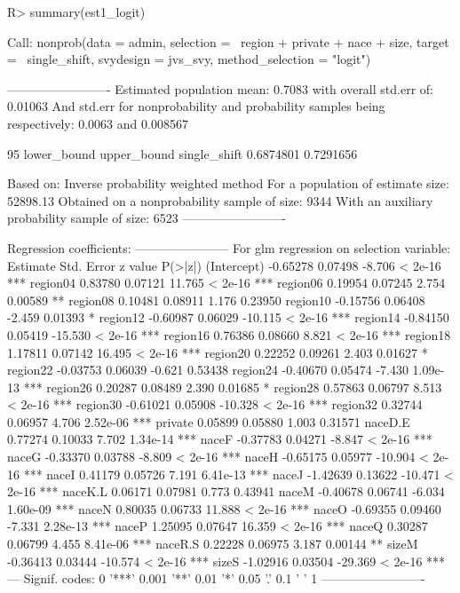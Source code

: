 \documentclass[
]{jss}
\begin{document}
\begin{CodeChunk}
\begin{CodeInput}
R> summary(est1_logit)
\end{CodeInput}
\begin{CodeOutput}

Call:
nonprob(data = admin, selection = ~region + private + nace + 
    size, target = ~single_shift, svydesign = jvs_svy, method_selection = "logit")

-------------------------
Estimated population mean: 0.7083 with overall std.err of: 0.01063
And std.err for nonprobability and probability samples being respectively:
0.0063 and 0.008567

95%
             lower_bound upper_bound
single_shift   0.6874801   0.7291656


Based on: Inverse probability weighted method
For a population of estimate size: 52898.13
Obtained on a nonprobability sample of size: 9344
With an auxiliary probability sample of size: 6523
-------------------------

Regression coefficients:
-----------------------
For glm regression on selection variable:
            Estimate Std. Error z value  P(>|z|)    
(Intercept) -0.65278    0.07498  -8.706  < 2e-16 ***
region04     0.83780    0.07121  11.765  < 2e-16 ***
region06     0.19954    0.07245   2.754  0.00589 ** 
region08     0.10481    0.08911   1.176  0.23950    
region10    -0.15756    0.06408  -2.459  0.01393 *  
region12    -0.60987    0.06029 -10.115  < 2e-16 ***
region14    -0.84150    0.05419 -15.530  < 2e-16 ***
region16     0.76386    0.08660   8.821  < 2e-16 ***
region18     1.17811    0.07142  16.495  < 2e-16 ***
region20     0.22252    0.09261   2.403  0.01627 *  
region22    -0.03753    0.06039  -0.621  0.53438    
region24    -0.40670    0.05474  -7.430 1.09e-13 ***
region26     0.20287    0.08489   2.390  0.01685 *  
region28     0.57863    0.06797   8.513  < 2e-16 ***
region30    -0.61021    0.05908 -10.328  < 2e-16 ***
region32     0.32744    0.06957   4.706 2.52e-06 ***
private      0.05899    0.05880   1.003  0.31571    
naceD.E      0.77274    0.10033   7.702 1.34e-14 ***
naceF       -0.37783    0.04271  -8.847  < 2e-16 ***
naceG       -0.33370    0.03788  -8.809  < 2e-16 ***
naceH       -0.65175    0.05977 -10.904  < 2e-16 ***
naceI        0.41179    0.05726   7.191 6.41e-13 ***
naceJ       -1.42639    0.13622 -10.471  < 2e-16 ***
naceK.L      0.06171    0.07981   0.773  0.43941    
naceM       -0.40678    0.06741  -6.034 1.60e-09 ***
naceN        0.80035    0.06733  11.888  < 2e-16 ***
naceO       -0.69355    0.09460  -7.331 2.28e-13 ***
naceP        1.25095    0.07647  16.359  < 2e-16 ***
naceQ        0.30287    0.06799   4.455 8.41e-06 ***
naceR.S      0.22228    0.06975   3.187  0.00144 ** 
sizeM       -0.36413    0.03444 -10.574  < 2e-16 ***
sizeS       -1.02916    0.03504 -29.369  < 2e-16 ***
---
Signif. codes:  0 '***' 0.001 '**' 0.01 '*' 0.05 '.' 0.1 ' ' 1
-------------------------


\end{CodeOutput}
\end{CodeChunk}
\end{document}
